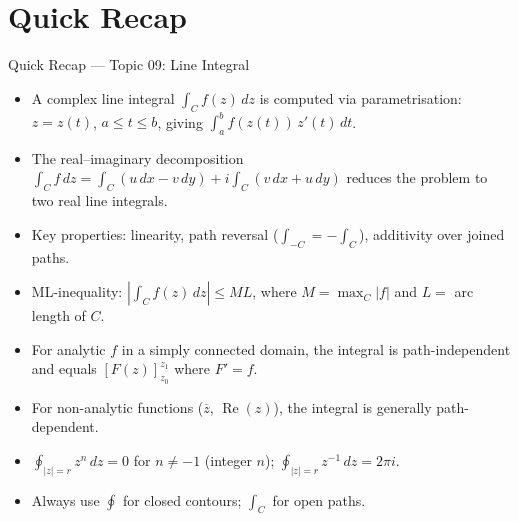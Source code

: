 \documentclass[12pt,a4paper]{article}
\begin{document}
\section{Quick Recap}
\begin{learnbox}{Quick Recap --- Topic 09: Line Integral}
\begin{itemize}[nosep]
  \item A complex line integral $\int_C f(z)\,dz$ is computed via
        parametrisation: $z = z(t)$, $a \le t \le b$, giving
        $\int_a^b f(z(t))\,z'(t)\,dt$.
  \item The real--imaginary decomposition
        $\int_C f\,dz = \int_C(u\,dx - v\,dy) + i\int_C(v\,dx + u\,dy)$
        reduces the problem to two real line integrals.
  \item Key properties: linearity, path reversal ($\int_{-C} = -\int_C$),
        additivity over joined paths.
  \item ML-inequality:
        $\displaystyle\left|\int_C f(z)\,dz\right| \le ML$,
        where $M = \max_C|f|$ and $L = $ arc length of $C$.
  \item For analytic $f$ in a simply connected domain, the integral is
        path-independent and equals $[F(z)]_{z_0}^{z_1}$ where
        $F' = f$.
  \item For non-analytic functions ($\overline{z}$, $\operatorname{Re}(z)$),
        the integral is generally path-dependent.
  \item $\oint_{|z|=r} z^n\,dz = 0$ for $n \ne -1$ (integer $n$);
        $\oint_{|z|=r} z^{-1}\,dz = 2\pi i$.
  \item Always use $\oint$ for closed contours; $\int_C$ for open paths.
\end{itemize}
\end{learnbox}
\end{document}
